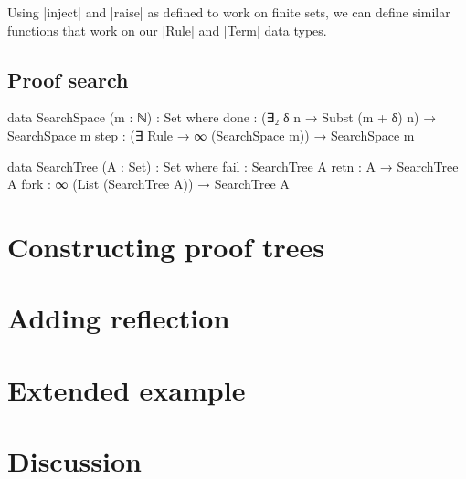 \documentclass[preprint]{sigplanconf}
\begin{document}
Using |inject| and |raise| as defined to work on finite sets, we can
define similar functions that work on our |Rule| and |Term| data
types.






\subsection{Proof search}

\begin{code}
  data SearchSpace (m : ℕ) : Set where
    done : (∃₂ δ n → Subst (m + δ) n) → SearchSpace m
    step : (∃ Rule → ∞ (SearchSpace m)) → SearchSpace m
\end{code}

\begin{code}
  data SearchTree (A : Set) : Set where
    fail : SearchTree A
    retn : A → SearchTree A
    fork : ∞ (List (SearchTree A)) → SearchTree A
\end{code}


\section{Constructing proof trees}
\label{sec:proofs}

\section{Adding reflection}
\label{sec:reflection}


\section{Extended example}
\label{sec:example}


\section{Discussion}
\label{sec:discussion}

\end{document}
